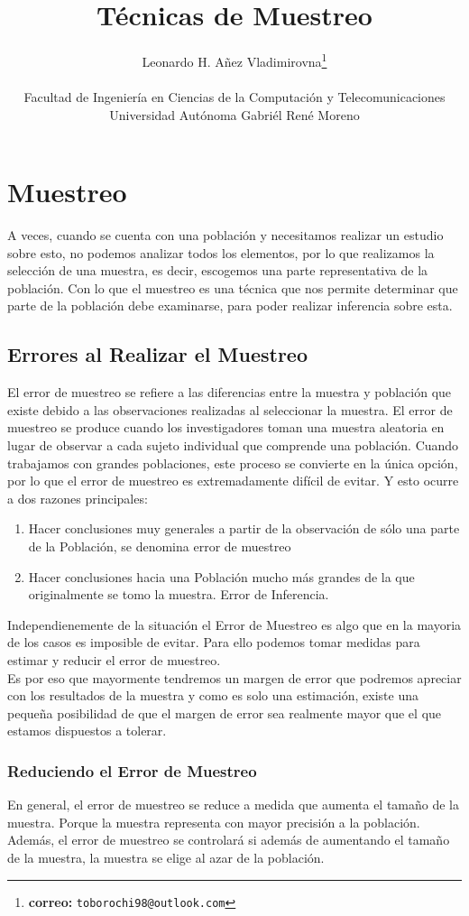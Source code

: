 \documentclass[10pt,letterpaper]{article}
\author{Leonardo H. Añez Vladimirovna\footnote{\textbf{correo:} \texttt{toborochi98@outlook.com}} \\ \vspace{0.1cm} \\
Facultad de Ingeniería en Ciencias de la Computación y Telecomunicaciones\\
Universidad Autónoma Gabriél René Moreno}
\title{Técnicas de Muestreo}
\begin{document}
\maketitle
\section{Muestreo}
A veces, cuando se cuenta con una población y necesitamos realizar un estudio sobre esto, no podemos analizar todos los elementos, por lo que realizamos la selección de una muestra, es decir, escogemos una parte representativa de la población. Con lo que el muestreo es una técnica que nos permite determinar que parte de la población debe examinarse, para poder realizar inferencia sobre esta.
\subsection{Errores al Realizar el Muestreo}
El error de muestreo se refiere a las diferencias entre la muestra y población que existe debido a las observaciones realizadas al seleccionar la muestra. El error de muestreo se produce cuando los investigadores toman una muestra aleatoria en lugar de observar a cada sujeto individual que comprende una población. 
Cuando trabajamos con grandes poblaciones, este proceso se convierte en la única opción, por lo que el error de muestreo es extremadamente difícil de evitar. Y esto ocurre a dos razones principales:
\begin{enumerate}
\item Hacer  conclusiones  muy  generales 
a  partir  de  la  observación  de  sólo  una  parte  de la Población, se denomina error de muestreo
\item Hacer  conclusiones hacia una Población mucho más grandes de la que originalmente 
se tomo la muestra. Error de Inferencia.
\end{enumerate}
Independienemente de la situación el Error de Muestreo es algo que en la mayoria de los casos es imposible de evitar. Para ello podemos tomar medidas para estimar y reducir el error de muestreo.\\${ }$\\
Es por eso que mayormente tendremos un margen de error que podremos apreciar con los resultados de la muestra y como es solo una estimación, existe una pequeña posibilidad de que el margen de error sea realmente mayor que el que estamos dispuestos a tolerar.
\subsubsection{Reduciendo el Error de Muestreo}
En general, el error de muestreo se reduce a medida que aumenta el tamaño de la muestra. Porque la muestra representa con mayor precisión a la población. Además, el error de muestreo se controlará si además de aumentando el tamaño de la muestra, la muestra se elige al azar de la
población.
\end{document}
